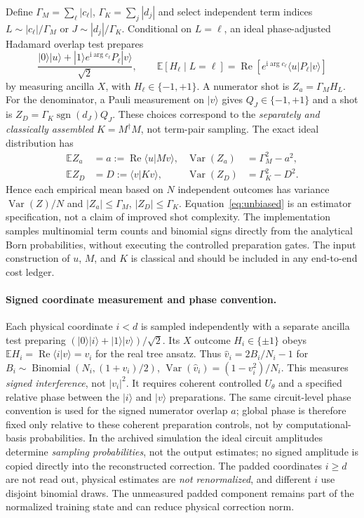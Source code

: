 \documentclass[11pt,a4paper]{article}
\theoremstyle{remark}\newtheorem{remark}[theorem]{Remark}
\begin{document}
Define $\Gamma_M=\sum_\ell|c_\ell|$, $\Gamma_K=\sum_j|d_j|$ and select independent term indices $L\sim|c_\ell|/\Gamma_M$ or $J\sim|d_j|/\Gamma_K$. Conditional on $L=\ell$, an ideal phase-adjusted Hadamard overlap test prepares
\begin{equation}\label{eq:overlapcircuit}
\frac{|0\rangle|u\rangle+|1\rangle e^{\mathrm i\arg c_\ell}P_\ell|v\rangle}{\sqrt2},\qquad
\mathbb E[H_\ell\mid L=\ell]=\operatorname{Re}\!\left[e^{\mathrm i\arg c_\ell}\langle u|P_\ell|v\rangle\right]
\end{equation}
by measuring ancilla $X$, with $H_\ell\in\{-1,+1\}$. A numerator shot is $Z_a=\Gamma_M H_L$. For the denominator, a Pauli measurement on $|v\rangle$ gives $Q_J\in\{-1,+1\}$ and a shot is $Z_D=\Gamma_K\operatorname{sgn}(d_J)Q_J$. These choices correspond to the \emph{separately and classically assembled} $K=M^\dagger M$, not term-pair sampling. The exact ideal distribution has
\begin{align}\label{eq:unbiased}
\mathbb E Z_a&=a:=\operatorname{Re}\langle u|Mv\rangle,&\operatorname{Var}(Z_a)&=\Gamma_M^2-a^2,\\
\mathbb E Z_D&=D:=\langle v|Kv\rangle,&\operatorname{Var}(Z_D)&=\Gamma_K^2-D^2.
\end{align}
Hence each empirical mean based on $N$ independent outcomes has variance $\operatorname{Var}(Z)/N$ and $|Z_a|\le\Gamma_M$, $|Z_D|\le\Gamma_K$. Equation~\eqref{eq:unbiased} is an estimator specification, not a claim of improved shot complexity. The implementation samples multinomial term counts and binomial signs directly from the analytical Born probabilities, without executing the controlled preparation gates. The input construction of $u$, $M$, and $K$ is classical and should be included in any end-to-end cost ledger.

\paragraph{Signed coordinate measurement and phase convention.} Each physical coordinate $i<d$ is sampled independently with a separate ancilla test preparing $(|0\rangle|i\rangle+|1\rangle|v\rangle)/\sqrt2$. Its $X$ outcome $H_i\in\{\pm1\}$ obeys $\mathbb E H_i=\operatorname{Re}\langle i|v\rangle=v_i$ for the real tree ansatz. Thus $\widehat v_i=2B_i/N_i-1$ for $B_i\sim\operatorname{Binomial}(N_i,(1+v_i)/2)$, $\operatorname{Var}(\widehat v_i)=(1-v_i^2)/N_i$. This measures \emph{signed interference}, not $|v_i|^2$. It requires coherent controlled $U_\theta$ and a specified relative phase between the $|i\rangle$ and $|v\rangle$ preparations. The same circuit-level phase convention is used for the signed numerator overlap $a$; global phase is therefore fixed only relative to these coherent preparation controls, not by computational-basis probabilities. In the archived simulation the ideal circuit amplitudes determine \emph{sampling probabilities}, not the output estimates; no signed amplitude is copied directly into the reconstructed correction. The padded coordinates $i\ge d$ are not read out, physical estimates are \emph{not renormalized}, and different $i$ use disjoint binomial draws. The unmeasured padded component remains part of the normalized training state and can reduce physical correction norm.
\end{document}
